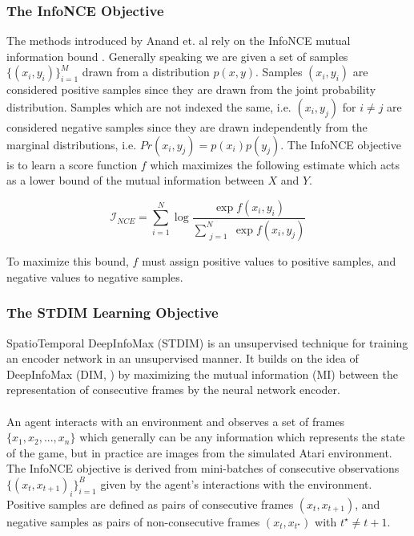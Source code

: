 \subsubsection{The InfoNCE Objective}

The methods introduced by Anand et. al \cite{main_article} rely on the InfoNCE mutual information bound \cite{infoNCE}. Generally speaking we are given a set of samples $\{(x_i, y_i)\}_{i=1}^{M}$ drawn from a distribution $p(x, y)$. Samples $(x_i, y_i)$ are considered positive samples since they are drawn from the joint probability distribution. Samples which are not indexed the same, i.e. $(x_i, y_j)$ for $i\neq j$ are considered negative samples since they are drawn independently from the marginal distributions, i.e. $Pr(x_i, y_j)=p(x_i)p(y_j)$. The InfoNCE objective is to learn a score function $f$ which maximizes the following estimate which acts as a lower bound of the mutual information between $X$ and $Y$.

\begin{equation}
\mathcal{I}_{NCE}=\sum_{i=1}^N\log{\frac{\exp{f(x_i,y_i)}}{\sum\limits_{\substack{j=1}}^N \exp{f(x_i,y_j)}}}
\label{eqn:info-nce}
\end{equation}

To maximize this bound, $f$ must assign positive values to positive samples, and negative values to negative samples.

\subsubsection{The STDIM Learning Objective}
SpatioTemporal DeepInfoMax (STDIM) is an unsupervised technique for training an encoder network in an unsupervised manner. It builds on the idea of DeepInfoMax (DIM, \cite{DIM}) by maximizing the mutual information (MI) between the representation of consecutive frames by the neural network encoder.
\\\\
An agent interacts with an environment and observes a set of frames $\{x_1, x_2,...,x_n\}$ which generally can be any information which represents the state of the game, but in practice are images from the simulated Atari environment. The InfoNCE objective is derived from mini-batches of consecutive observations $\{(x_t,x_{t+1})_i\}_{i=1}^{B}$ given by the agent's interactions with the environment. Positive samples are defined as pairs of consecutive frames $(x_t,x_{t+1})$, and negative samples as pairs of non-consecutive frames $(x_t,x_{t^\star})$ with $t^\star\ne t+1$. \\

